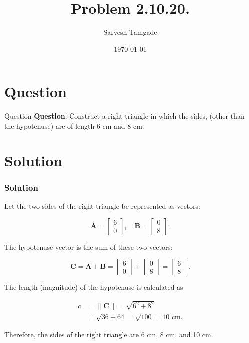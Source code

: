 \documentclass{beamer}
\title{Problem 2.10.20.}
\author{Sarvesh Tamgade}
\date{\today}
\theoremstyle{remark}
\numberwithin{equation}{section}
\begin{document}
\begin{frame}
\titlepage
\end{frame}

\section{Question}
\begin{frame}{Question}
\textbf{Question}:
 Construct a right triangle in which the sides, (other than the hypotenuse) are of length 6 cm and 8 cm.
\end{frame}

\section{Solution}
\begin{frame}[fragile]
    \frametitle{Solution}
Let the two sides of the right triangle be represented as vectors:

\[
\mathbf{A} = \begin{bmatrix} 6 \\ 0 \end{bmatrix}, \quad
\mathbf{B} = \begin{bmatrix} 0 \\ 8 \end{bmatrix}.
\]

The hypotenuse vector is the sum of these two vectors:

\[
\mathbf{C} = \mathbf{A} + \mathbf{B} = \begin{bmatrix} 6 \\ 0 \end{bmatrix} + \begin{bmatrix} 0 \\ 8 \end{bmatrix} = \begin{bmatrix} 6 \\ 8 \end{bmatrix}.
\]

The length (magnitude) of the hypotenuse is calculated as

\begin{align*}
c &= \| \mathbf{C} \| = \sqrt{6^2 + 8^2} \\
  &= \sqrt{36 + 64} = \sqrt{100} = 10 \text{ cm}.
\end{align*}

Therefore, the sides of the right triangle are 6 cm, 8 cm, and 10 cm.


\end{frame}
\end{document}
